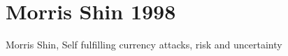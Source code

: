 \documentclass[draft.tex]{subfiles}
\begin{document}
\chapter{Morris Shin 1998}
Morris Shin, Self fulfilling currency attacks, risk and uncertainty
\end{document}
